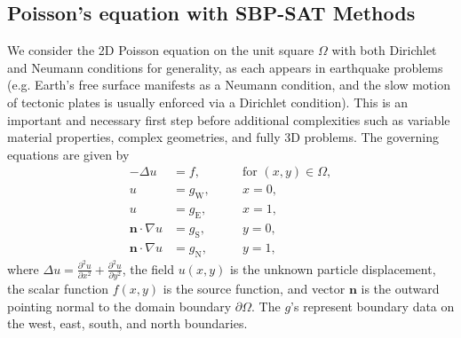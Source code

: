 \subsection{Poisson's equation with SBP-SAT Methods}
We consider the 2D Poisson equation on the unit square $\Omega$ with both Dirichlet and Neumann conditions for generality, as each appears in earthquake problems (e.g. Earth's free surface manifests as a Neumann condition, and the slow motion of tectonic plates is usually enforced via a Dirichlet condition). This is an important and necessary first step before additional complexities such as variable material properties, complex geometries, and fully 3D problems. The governing equations are given by
\begin{subequations}\label{eqn:poisson_eqn}
\begin{alignat}{3}
-\Delta u &= f,  &&\quad{\text {for } (x, y) \in \Omega}, \\ 
u &= g_{\text{W}},  &&\quad x = 0,\\ 
u&= g_{\text{E}}, &&\quad x = 1,\\ 
\boldsymbol{n} \cdot \nabla u&=g_{\text{S}}, &&\quad y = 0, \\
\boldsymbol{n} \cdot \nabla u&=g_{\text{N}}, &&\quad y = 1,
\end{alignat}
\end{subequations}
where $\Delta u = \frac{\partial^2 u}{\partial x^2} + \frac{\partial^2 u}{\partial y^2}$, the field $u(x, y)$ is the unknown particle displacement, the scalar function $f(x,y)$ is the source function,
 and vector $\boldsymbol{n}$ is the outward pointing normal to the domain boundary $\partial\Omega$. The $g$'s represent boundary data on the west, east, south, and north boundaries.
 
